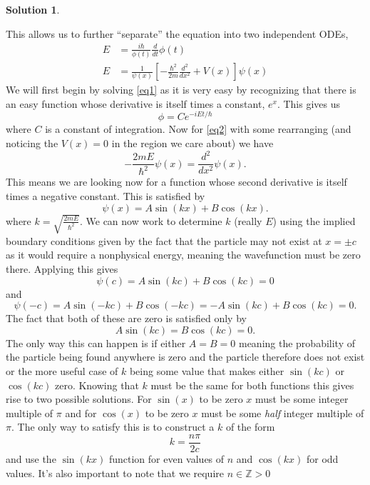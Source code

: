 \documentclass[10pt]{article}
\theoremstyle{definition}
\newtheorem{soln}{Solution}
\begin{document}
\begin{soln}
\begin{enumerate}[label=(\alph*)]
          This allows us to further ``separate'' the equation into two independent ODEs,
          \begin{align}
            E & =\frac{i\hbar}{\phi(t)}\frac{d}{d t}\phi(t) \label{eq1}                                      \\
            E & =\frac{1}{\psi(x)}\left[-\frac{\hbar^2}{2m}\frac{d^2}{d x^2} + V(x)\right]\psi(x)\label{eq2}
          \end{align}
          We will first begin by solving \ref{eq1} as it is very easy by recognizing that there is an easy function whose derivative is itself times a constant, $e^x$.
          This gives us
          $$\phi=Ce^{-iEt/\hbar}$$
          where $C$ is a constant of integration.
          Now for \ref{eq2} with some rearranging (and noticing the $V(x)=0$ in the region we care about) we have
          $$-\frac{2mE}{\hbar^2}\psi(x)=\frac{d^2}{d x^2}\psi(x).$$
          This means we are looking now for a function whose second derivative is itself times a negative constant.
          This is satisfied by
          $$\psi(x)=A\sin\left(kx\right)+B\cos\left(kx\right).$$
          where $k=\sqrt{\frac{2mE}{\hbar^2}}$.
          We can now work to determine $k$ (really $E$) using the implied boundary conditions given by the fact that the particle may not exist at $x=\pm c$ 
          as it would require a nonphysical energy, meaning the wavefunction
          must be zero there. Applying this gives
          $$\psi(c)=A\sin\left(kc\right)+B\cos\left(kc\right)=0$$
          and
          $$\psi(-c)=A\sin\left(-kc\right)+B\cos\left(-kc\right)=-A\sin\left(kc\right)+B\cos\left(kc\right)=0.$$
          The fact that both of these are zero is satisfied only by
          $$A\sin\left(kc\right)=B\cos\left(kc\right)=0.$$
          The only way this can happen is if either $A=B=0$ meaning the probability of the particle being found anywhere is zero and the particle therefore does not exist
          or the more useful case of $k$ being some value that makes either $\sin\left(kc\right)$ or $\cos\left(kc\right)$ zero. Knowing that
          $k$ must be the same for both functions this gives rise to two possible solutions. For $\sin(x)$ to be zero $x$ must be some integer multiple of $\pi$ and
          for $\cos(x)$ to be zero $x$ must be some \emph{half} integer multiple of $\pi$. The only way to satisfy this is to construct a $k$ of the form
          $$k=\frac{n\pi}{2c}$$
          and use the $\sin(kx)$ function for even values of $n$ and $\cos(kx)$ for odd values. It's also important to note that we require $n\in \mathbb{Z}>0$

\end{enumerate}
\end{soln}
\end{document}

